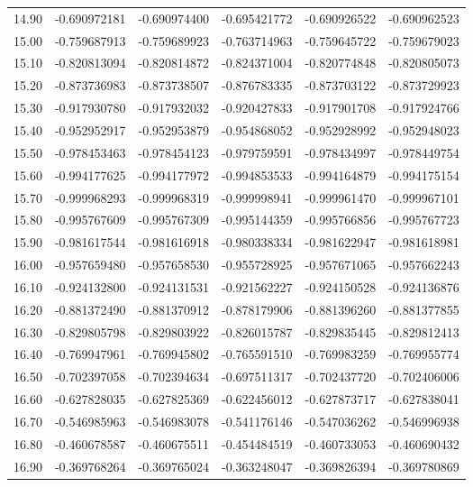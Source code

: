 \documentclass[11pt,a4paper]{article}
\begin{document}
\begin{longtable}{rrrrrr}
14.90 & -0.690972181 & -0.690974400 & -0.695421772 & -0.690926522 & -0.690962523 \\
15.00 & -0.759687913 & -0.759689923 & -0.763714963 & -0.759645722 & -0.759679023 \\
15.10 & -0.820813094 & -0.820814872 & -0.824371004 & -0.820774848 & -0.820805073 \\
15.20 & -0.873736983 & -0.873738507 & -0.876783335 & -0.873703122 & -0.873729923 \\
15.30 & -0.917930780 & -0.917932032 & -0.920427833 & -0.917901708 & -0.917924766 \\
15.40 & -0.952952917 & -0.952953879 & -0.954868052 & -0.952928992 & -0.952948023 \\
15.50 & -0.978453463 & -0.978454123 & -0.979759591 & -0.978434997 & -0.978449754 \\
15.60 & -0.994177625 & -0.994177972 & -0.994853533 & -0.994164879 & -0.994175154 \\
15.70 & -0.999968293 & -0.999968319 & -0.999998941 & -0.999961470 & -0.999967101 \\
15.80 & -0.995767609 & -0.995767309 & -0.995144359 & -0.995766856 & -0.995767723 \\
15.90 & -0.981617544 & -0.981616918 & -0.980338334 & -0.981622947 & -0.981618981 \\
16.00 & -0.957659480 & -0.957658530 & -0.955728925 & -0.957671065 & -0.957662243 \\
16.10 & -0.924132800 & -0.924131531 & -0.921562227 & -0.924150528 & -0.924136876 \\
16.20 & -0.881372490 & -0.881370912 & -0.878179906 & -0.881396260 & -0.881377855 \\
16.30 & -0.829805798 & -0.829803922 & -0.826015787 & -0.829835445 & -0.829812413 \\
16.40 & -0.769947961 & -0.769945802 & -0.765591510 & -0.769983259 & -0.769955774 \\
16.50 & -0.702397058 & -0.702394634 & -0.697511317 & -0.702437720 & -0.702406006 \\
16.60 & -0.627828035 & -0.627825369 & -0.622456012 & -0.627873717 & -0.627838041 \\
16.70 & -0.546985963 & -0.546983078 & -0.541176146 & -0.547036262 & -0.546996938 \\
16.80 & -0.460678587 & -0.460675511 & -0.454484519 & -0.460733053 & -0.460690432 \\
16.90 & -0.369768264 & -0.369765024 & -0.363248047 & -0.369826394 & -0.369780869 \\

\end{longtable}
\end{document}
